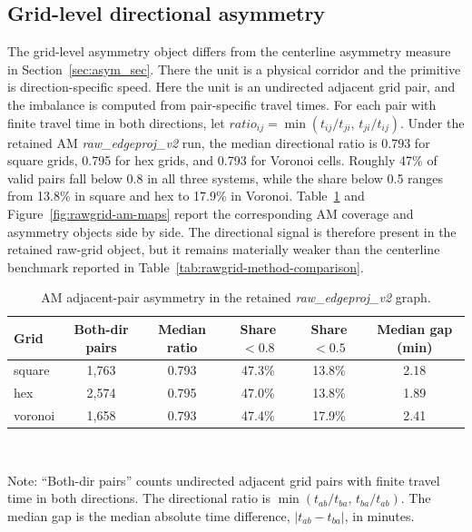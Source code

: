 \documentclass[12pt]{article}
\begin{document}
	\subsection{Grid-level directional asymmetry}

	The grid-level asymmetry object differs from the centerline asymmetry measure in Section~\ref{sec:asym_sec}. There the unit is a physical corridor and the primitive is direction-specific speed. Here the unit is an undirected adjacent grid pair, and the imbalance is computed from pair-specific travel times. For each pair with finite travel time in both directions, let $ratio_{ij} = \min(t_{ij}/t_{ji},\, t_{ji}/t_{ij})$. Under the retained AM \emph{raw\_edgeproj\_v2} run, the median directional ratio is 0.793 for square grids, 0.795 for hex grids, and 0.793 for Voronoi cells. Roughly 47\% of valid pairs fall below 0.8 in all three systems, while the share below 0.5 ranges from 13.8\% in square and hex to 17.9\% in Voronoi. Table~\ref{tab:rawgrid-asymmetry-am} and Figure~\ref{fig:rawgrid-am-maps} report the corresponding AM coverage and asymmetry objects side by side. The directional signal is therefore present in the retained raw-grid object, but it remains materially weaker than the centerline benchmark reported in Table~\ref{tab:rawgrid-method-comparison}.

	\begin{table}[h!]
		\centering
		\caption{AM adjacent-pair asymmetry in the retained \emph{raw\_edgeproj\_v2} graph.}
		\label{tab:rawgrid-asymmetry-am}
		\begin{tabular}{lccccc}
			\toprule
			Grid & Both-dir pairs & Median ratio & Share $<0.8$ & Share $<0.5$ & Median gap (min) \\
			\midrule
			square  & 1,763 & 0.793 & 47.3\% & 13.8\% & 2.18 \\
			hex     & 2,574 & 0.795 & 47.0\% & 13.8\% & 1.89 \\
			voronoi & 1,658 & 0.793 & 47.4\% & 17.9\% & 2.41 \\
			\bottomrule
		\end{tabular} \\
		\vspace{0.3em}
		\begin{minipage}{\textwidth}
			\footnotesize
			\raggedright
			Note: ``Both-dir pairs'' counts undirected adjacent grid pairs with finite travel time in both directions. The directional ratio is $\min(t_{ab}/t_{ba},\, t_{ba}/t_{ab})$. The median gap is the median absolute time difference, $|t_{ab}-t_{ba}|$, in minutes.
		\end{minipage}
	\end{table}
\end{document}
